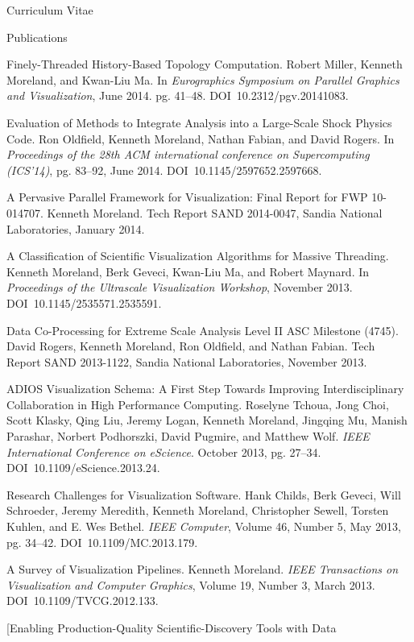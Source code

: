 \documentclass{article}
\begin{document}
\begin{cv}{Curriculum Vitae}
\begin{cvlist}{Publications}
    \item[Finely-Threaded History-Based Topology Computation.] Robert
      Miller, Kenneth Moreland, and Kwan-Liu Ma. In \emph{Eurographics
        Symposium on Parallel Graphics and Visualization}, June 2014. pg.
      41--48. DOI~10.2312/pgv.20141083.
    \item[Evaluation of Methods to Integrate Analysis into a Large-Scale
      Shock] Physics Code. Ron Oldfield, Kenneth Moreland, Nathan Fabian,
      and David Rogers. In \emph{Proceedings of the 28th ACM international
        conference on Supercomputing (ICS'14)}, pg. 83--92, June 2014.
      DOI~10.1145/2597652.2597668.
    \item[A Pervasive Parallel Framework for Visualization: Final Report
      for FWP] 10-014707. Kenneth Moreland. Tech Report SAND 2014-0047,
      Sandia National Laboratories, January 2014.
    \item[A Classification of Scientific Visualization Algorithms for
      Massive] Threading. Kenneth Moreland, Berk Geveci, Kwan-Liu Ma, and
      Robert Maynard. In \emph{Proceedings of the Ultrascale Visualization
        Workshop}, November 2013. DOI~10.1145/2535571.2535591.
    \item[Data Co-Processing for Extreme Scale Analysis Level II ASC
      Milestone] (4745). David Rogers, Kenneth Moreland, Ron Oldfield, and
      Nathan Fabian. Tech Report SAND 2013-1122, Sandia National
      Laboratories, November 2013.
    \item[ADIOS Visualization Schema: A First Step Towards Improving]
      Interdisciplinary Collaboration in High Performance Computing.
      Roselyne Tchoua, Jong Choi, Scott Klasky, Qing Liu, Jeremy Logan,
      Kenneth Moreland, Jingqing Mu, Manish Parashar, Norbert Podhorszki,
      David Pugmire, and Matthew Wolf. \emph{IEEE International Conference
        on eScience}. October 2013, pg. 27--34.
      DOI~10.1109/eScience.2013.24.
    \item[Research Challenges for Visualization Software.] Hank Childs, Berk
      Geveci, Will Schroeder, Jeremy Meredith, Kenneth Moreland,
      Christopher Sewell, Torsten Kuhlen, and E. Wes Bethel. \emph{IEEE
        Computer}, Volume 46, Number 5, May 2013, pg. 34--42.
      DOI~10.1109/MC.2013.179.
    \item[A Survey of Visualization Pipelines.] Kenneth
      Moreland. \emph{IEEE Transactions on Visualization and Computer
        Graphics}, Volume 19, Number 3, March 2013.
      DOI~10.1109/TVCG.2012.133.
    \item[Enabling Production-Quality Scientific-Discovery Tools with Data

\end{cvlist}
\end{cv}
\end{document}
